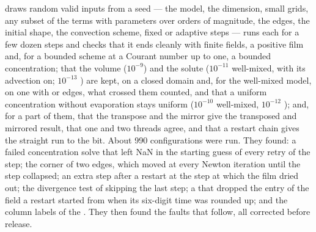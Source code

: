  draws random valid inputs from a seed --- the model,
the dimension, small grids, any subset of the terms with parameters over
orders of magnitude, the edges, the initial shape, the convection scheme,
fixed or adaptive steps --- runs each for a few dozen steps and checks that it
ends cleanly with finite fields, a positive film and, for a bounded scheme at
a Courant number up to one, a bounded concentration; that the volume
($10^{-9}$) and the solute ($10^{-11}$ well-mixed, with its advection on;
$10^{-13}$ ) are kept, on a closed domain and, for the
well-mixed model, on one with  or  edges,
what crossed them counted, and that a uniform
concentration without evaporation stays uniform ($10^{-10}$ well-mixed,
$10^{-12}$ ); and, for a
part of them, that the transpose and the mirror give the transposed and
mirrored result, that one and two threads agree, and that a restart chain
gives the straight run to the bit. About 990 configurations were run. They
found: a failed concentration solve that left NaN in the starting guess of
every retry of the step; the corner of two  edges, which
moved at every Newton iteration until the step collapsed; an extra step after
a restart at the step at which the film dried out; the divergence test of
 skipping the last step; a  that dropped the entry of the
field a restart started from when its six-digit time was rounded up; and the
column labels of the  . They then found the
faults that follow, all corrected before release.

